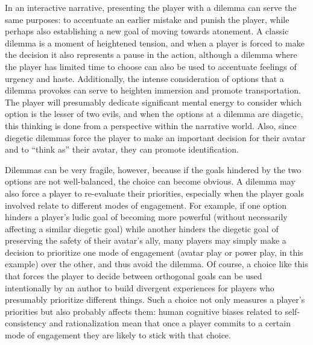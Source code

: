 In an interactive narrative, presenting the player with a dilemma can serve the same purposes: to accentuate an earlier mistake and punish the player, while perhaps also establishing a new goal of moving towards atonement.
%
A classic dilemma is a moment of heightened tension, and when a player is forced to make the decision it also represents a pause in the action, although a dilemma where the player has limited time to choose can also be used to accentuate feelings of urgency and haste.
%
Additionally, the intense consideration of options that a dilemma provokes can serve to heighten immersion and promote transportation.
%
The player will presumably dedicate significant mental energy to consider which option is the lesser of two evils, and when the options at a dilemma are diagetic, this thinking is done from a perspective within the narrative world.
%
Also, since diegetic dilemmas force the player to make an important decision for their avatar and to ``think as'' their avatar, they can promote identification.


Dilemmas can be very fragile, however, because if the goals hindered by the two options are not well-balanced, the choice can become obvious.
%
A dilemma may also force a player to re-evaluate their priorities, especially when the player goals involved relate to different modes of engagement.
%
For example, if one option hinders a player's ludic goal of becoming more powerful (without necessarily affecting a similar diegetic goal) while another hinders the diegetic goal of preserving the safety of their avatar's ally, many players may simply make a decision to prioritize one mode of engagement (avatar play or power play, in this example) over the other, and thus avoid the dilemma.
%
Of course, a choice like this that forces the player to decide between orthogonal goals can be used intentionally by an author to build divergent experiences for players who presumably prioritize different things.
%
Such a choice not only measures a player's priorities but also probably affects them: human cognitive biases related to self-consistency and rationalization mean that once a player commits to a certain mode of engagement they are likely to stick with that choice. 


